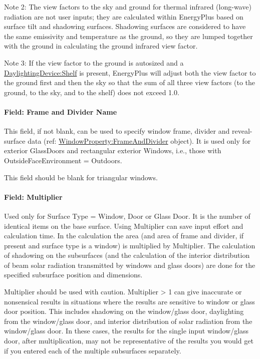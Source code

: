 Note 2: The view factors to the sky and ground for thermal infrared (long-wave) radiation are not user inputs; they are calculated within EnergyPlus based on surface tilt and shadowing surfaces. Shadowing surfaces are considered to have the same emissivity and temperature as the ground, so they are lumped together with the ground in calculating the ground infrared view factor.

Note 3: If the view factor to the ground is autosized and a \hyperref[daylightingdeviceshelf]{DaylightingDevice:Shelf} is present, EnergyPlus will adjust both the view factor to the ground first and then the sky so that the sum of all three view factors (to the ground, to the sky, and to the shelf) does not exceed 1.0.

\paragraph{Field: Frame and Divider Name}\label{field-frame-and-divider-name-2}

This field, if not blank, can be used to specify window frame, divider and reveal-surface data (ref: \hyperref[windowpropertyframeanddivider]{WindowProperty:FrameAndDivider} object). It is used only for exterior GlassDoors and rectangular exterior Windows, i.e., those with OutsideFaceEnvironment = Outdoors.

This field should be blank for triangular windows.

\paragraph{Field: Multiplier}\label{field-multiplier-7}

Used only for Surface Type = Window, Door or Glass Door. It is the number of identical items on the base surface. Using Multiplier can save input effort and calculation time. In the calculation the area (and area of frame and divider, if present and surface type is a window) is multiplied by Multiplier. The calculation of shadowing on the subsurfaces (and the calculation of the interior distribution of beam solar radiation transmitted by windows and glass doors) are done for the specified subsurface position and dimensions.

Multiplier should be used with caution. Multiplier \textgreater{} 1 can give inaccurate or nonsensical results in situations where the results are sensitive to window or glass door position. This includes shadowing on the window/glass door, daylighting from the window/glass door, and interior distribution of solar radiation from the window/glass door. In these cases, the results for the single input window/glass door, after multiplication, may not be representative of the results you would get if you entered each of the multiple subsurfaces separately.

